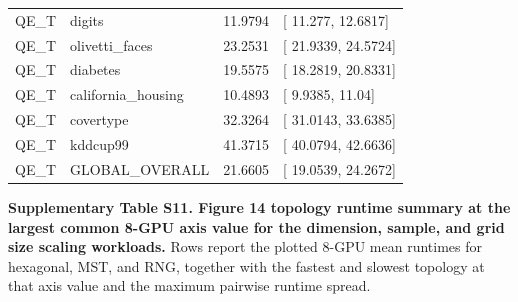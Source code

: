 \documentclass[
]{article}
\providecommand{\DIFadd}[1]{{\protect\color{blue} #1}} %
\providecommand{\DIFaddbegin}{} %
\providecommand{\DIFaddend}{} %
\begin{document}
{\begin{longtable}[]{@{}llll@{}}
\DIFadd{QE\_T }& \DIFadd{digits }& \DIFadd{11.9794 }& {[}\DIFadd{11.277, 12.6817}{]} \\
\DIFadd{QE\_T }& \DIFadd{olivetti\_faces }& \DIFadd{23.2531 }& {[}\DIFadd{21.9339, 24.5724}{]} \\
\DIFadd{QE\_T }& \DIFadd{diabetes }& \DIFadd{19.5575 }& {[}\DIFadd{18.2819, 20.8331}{]} \\
\DIFadd{QE\_T }& \DIFadd{california\_housing }& \DIFadd{10.4893 }& {[}\DIFadd{9.9385, 11.04}{]} \\
\DIFadd{QE\_T }& \DIFadd{covertype }& \DIFadd{32.3264 }& {[}\DIFadd{31.0143, 33.6385}{]} \\
\DIFadd{QE\_T }& \DIFadd{kddcup99 }& \DIFadd{41.3715 }& {[}\DIFadd{40.0794, 42.6636}{]} \\
\DIFadd{QE\_T }& \DIFadd{GLOBAL\_OVERALL }& \DIFadd{21.6605 }& {[}\DIFadd{19.0539, 24.2672}{]} \\
\end{longtable}
}

\DIFaddend \textbf{Supplementary Table S11. Figure  \DIFaddbegin \DIFadd{14 }\DIFaddend topology runtime summary at
the largest common 8-GPU axis value for the dimension, sample, and grid
size scaling workloads.} Rows report the plotted 8-GPU mean runtimes for
hexagonal, MST, and RNG, together with the fastest and slowest topology
at that axis value and the maximum pairwise runtime spread.
\end{document}
